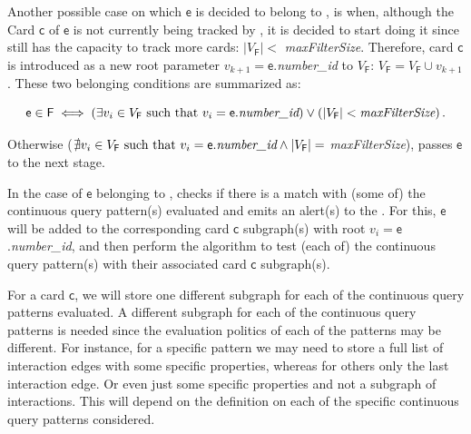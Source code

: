 \begin{itemize}
    Another possible case on which $\mathsf{e}$ is decided to belong to \filter \F, is when, although the Card $\mathsf{c}$ of $\mathsf{e}$ is not currently being tracked by \F, it is decided to start doing it since \F still has the capacity to track more cards: $|V_{\mathsf{F}}| < $ \emph{maxFilterSize}. Therefore, card $\mathsf{c}$ is introduced as a new root parameter $v_{k+1} = \mathsf{e}$.\emph{number\_id} to $V_{\mathsf{F}}$: $V_{\mathsf{F}} = V_{\mathsf{F}} \cup v_{k+1}$. These two belonging conditions are summarized as:
    
    $$
    \mathsf{e} \in \mathsf{F} \iff 
    \left(\exists v_i \in V_{\mathsf{F}} \text{ such that } v_i = \mathsf{e}.\emph{number\_id} \right) 
    \lor \left(|V_{\mathsf{F}}| < \emph{maxFilterSize}\right).
    $$

    Otherwise ($\nexists v_i \in V_{\mathsf{F}} \text{ such that } v_i = \mathsf{e}.\emph{number\_id} \land |V_{\mathsf{F}}| = $ \emph{maxFilterSize}), \F passes $\mathsf{e}$ to the next stage.

    In the case of $\mathsf{e}$ belonging to \F, \F checks if there is a match with (some of) the continuous query pattern(s) evaluated and emits an alert(s) to the \sink \Sk. For this, $\mathsf{e}$ will be added to the corresponding card $\mathsf{c}$ subgraph(s) with root $v_i =\mathsf{e}$.\emph{number\_id}, and then perform the algorithm to test (each of) the continuous query pattern(s) with their associated card $\mathsf{c}$ subgraph(s). 

    For a card $\mathsf{c}$, we will store one different subgraph for each of the continuous query patterns evaluated. A different subgraph for each of the continuous query patterns is needed since the evaluation politics of each of the patterns may be different. For instance, for a specific pattern we may need to store a full list of interaction edges with some specific properties, whereas for others only the last interaction edge. Or even just some specific properties and not a subgraph of interactions. This will depend on the definition on each of the specific continuous query patterns considered.


\end{itemize}
